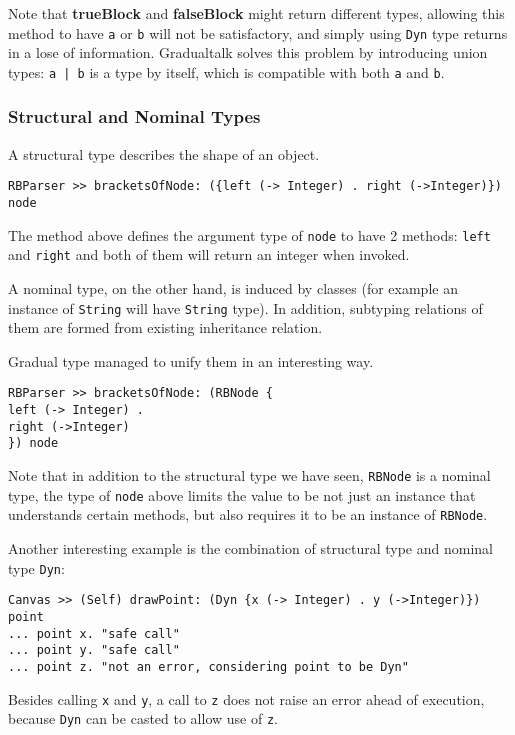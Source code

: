 Note that \textbf{trueBlock} and \textbf{falseBlock} might return
different types, allowing this method to have \texttt{a} or \texttt{b}
will not be satisfactory, and simply using \texttt{Dyn} type
returns in a lose of information.
Gradualtalk solves this problem by introducing union types: \texttt{a | b}
is a type by itself, which is compatible with both \texttt{a} and \texttt{b}.

\subsubsection{Structural and Nominal Types}

A structural type describes the shape of an object.

\begin{verbatim}
RBParser >> bracketsOfNode: ({left (-> Integer) . right (->Integer)}) node
\end{verbatim}

The method above defines the argument type of \texttt{node} to have 2 methods:
\texttt{left} and \texttt{right} and both of them will return an integer when invoked.

A nominal type, on the other hand, is induced by classes
(for example an instance of \texttt{String} will have \texttt{String} type).
In addition, subtyping relations of them are formed from existing inheritance relation.

Gradual type managed to unify them in an interesting way.

\begin{verbatim}
RBParser >> bracketsOfNode: (RBNode {
left (-> Integer) .
right (->Integer)
}) node
\end{verbatim}

Note that in addition to the structural type we have seen,
\texttt{RBNode} is a nominal type, the type of \texttt{node} above
limits the value to be not just an instance that understands certain methods,
but also requires it to be an instance of \texttt{RBNode}.

Another interesting example is the combination of structural type
and nominal type \texttt{Dyn}:

\begin{verbatim}
Canvas >> (Self) drawPoint: (Dyn {x (-> Integer) . y (->Integer)}) point
... point x. "safe call"
... point y. "safe call"
... point z. "not an error, considering point to be Dyn"
\end{verbatim}

Besides calling \texttt{x} and \texttt{y}, a call to \texttt{z} does not
raise an error ahead of execution, because \texttt{Dyn} can be casted to allow use of
\texttt{z}.

